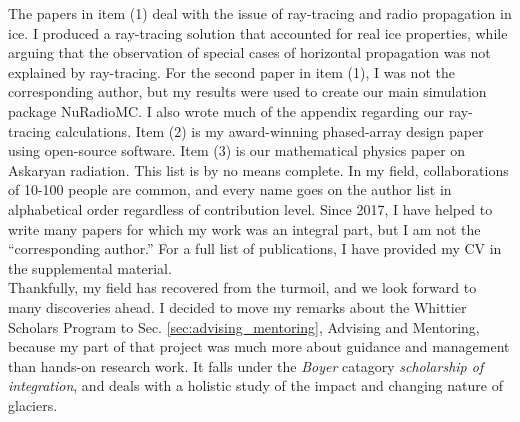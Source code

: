 \documentclass[../../main.tex]{subfiles}
\begin{document}
The papers in item (1) deal with the issue of ray-tracing and radio propagation in ice.  I produced a ray-tracing solution that accounted for real ice properties, while arguing that the observation of special cases of horizontal propagation was not explained by ray-tracing.  For the second paper in item (1), I was not the corresponding author, but my results were used to create our main simulation package NuRadioMC.  I also wrote much of the appendix regarding our ray-tracing calculations.  Item (2) is my award-winning phased-array design paper using open-source software.  Item (3) is our mathematical physics paper on Askaryan radiation.  This list is by no means complete.  In my field, collaborations of 10-100 people are common, and every name goes on the author list in alphabetical order regardless of contribution level.  Since 2017, I have helped to write many papers for which my work was an integral part, but I am not the ``corresponding author.''  For a full list of publications, I have provided my CV in the supplemental material.
\\
\vspace{0.25cm}
Thankfully, my field has recovered from the turmoil, and we look forward to many discoveries ahead.  I decided to move my remarks about the Whittier Scholars Program to Sec. \ref{sec:advising_mentoring}, Advising and Mentoring, because my part of that project was much more about guidance and management than hands-on research work.  It falls under the \textit{Boyer} catagory \textit{scholarship of integration}, and deals with a holistic study of the impact and changing nature of glaciers.
\end{document}
